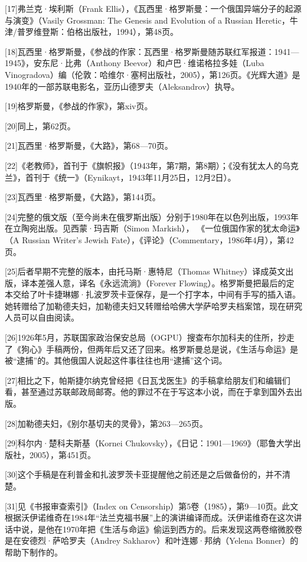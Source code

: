 [17]弗兰克·埃利斯（Frank Ellis），《瓦西里·格罗斯曼：一个俄国异端分子的起源与演变》（Vasily Grossman: The Genesis and Evolution of a Russian Heretic，牛津/普罗维登斯：伯格出版社，1994），第48页。

[18]瓦西里·格罗斯曼，《参战的作家：瓦西里·格罗斯曼随苏联红军报道：1941—1945》，安东尼·比弗（Anthony Beevor）和卢巴·维诺格拉多娃（Luba Vinogradova）编（伦敦：哈维尔·塞柯出版社，2005），第126页。《光辉大道》是1940年的一部苏联电影名，亚历山德罗夫（Aleksandrov）执导。

[19]格罗斯曼，《参战的作家》，第xiv页。

[20]同上，第62页。

[21]瓦西里·格罗斯曼，《大路》，第68—70页。

[22]《老教师》，首刊于《旗帜报》（1943年，第7期，第8期）；《没有犹太人的乌克兰》，首刊于《统一》（Eynikayt，1943年11月25日，12月2日）。

[23]瓦西里·格罗斯曼，《大路》，第144页。

[24]完整的俄文版（至今尚未在俄罗斯出版）分别于1980年在以色列出版，1993年在立陶宛出版。见西蒙·玛吉斯（Simon Markish）， 《一位俄国作家的犹太命运》（A Russian Writer’s Jewish Fate），《评论》（Commentary，1986年4月），第42页。

[25]后者早期不完整的版本，由托马斯·惠特尼（Thomas Whitney）译成英文出版，译本差强人意，译名《永远流淌》（Forever Flowing）。格罗斯曼把最后的定本交给了叶卡捷琳娜·扎波罗茨卡亚保存，是一个打字本，中间有手写的插入语。她转赠给了加勒德夫妇，加勒德夫妇又转赠给哈佛大学萨哈罗夫档案馆，现在研究人员可以自由阅读。

[26]1926年5月，苏联国家政治保安总局（OGPU）搜查布尔加科夫的住所，抄走了《狗心》手稿两份，但两年后又还了回来。格罗斯曼总是说，《生活与命运》是被“逮捕”的。其他俄国人说起这件事往往也用“逮捕”这个词。

[27]相比之下，帕斯捷尔纳克曾经把《日瓦戈医生》的手稿拿给朋友们和编辑们看，甚至通过苏联邮政局邮寄。他的罪过不在于写这本小说，而在于拿到国外去出版。

[28]加勒德夫妇，《别尔基切夫的灵骨》，第263—265页。

[29]科尔内·楚科夫斯基（Kornei Chukovsky），《日记：1901—1969》（耶鲁大学出版社，2005），第451页。

[30]这个手稿是在利普金和扎波罗茨卡亚提醒他之前还是之后做备份的，并不清楚。

[31]见《书报审查索引》（Index on Censorship）第5卷（1985），第9—10页。此文根据沃伊诺维奇在1984年“法兰克福书展”上的演讲编译而成。沃伊诺维奇在这次讲话中说，是他在1970年把《生活与命运》偷运到西方的。后来发现这两卷缩微胶卷是在安德烈·萨哈罗夫（Andrey Sakharov）和叶连娜·邦纳（Yelena Bonner）的帮助下制作的。

